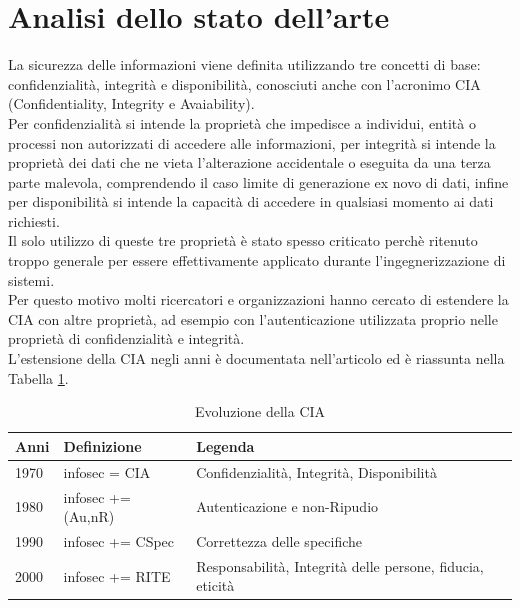 \section{Analisi dello stato dell'arte}

La sicurezza delle informazioni viene definita utilizzando tre concetti di base:
confidenzialità, integrità e disponibilità, conosciuti anche con l'acronimo CIA (Confidentiality, Integrity e Avaiability).\\
Per confidenzialità si intende la proprietà che impedisce a individui, entità o processi non autorizzati di accedere alle informazioni, per integrità si intende la proprietà dei dati che ne vieta l'alterazione accidentale o eseguita da una terza parte malevola, comprendendo il caso limite di generazione ex novo di dati, infine per disponibilità si intende la capacità di accedere in qualsiasi momento ai dati richiesti.\\
Il solo utilizzo di queste tre proprietà è stato spesso criticato perchè ritenuto troppo generale per essere effettivamente applicato durante l'ingegnerizzazione di sistemi.\\
Per questo motivo molti ricercatori e organizzazioni hanno cercato di estendere la CIA con altre proprietà, ad esempio con l'autenticazione utilizzata proprio nelle proprietà di confidenzialità e integrità.\\
L'estensione della CIA negli anni è documentata nell'articolo \cite*{SC14} ed è riassunta nella Tabella \ref*{tab:cia}.

\begin{table}[h!]
    \begin{tabular}{@{}lll@{}}
    \toprule
    \textbf{Anni} & \textbf{Definizione} & \textbf{Legenda}                                          \\ \midrule
    1970         & infosec = CIA        & Confidenzialità, Integrità, Disponibilità                 \\
    1980         & infosec += (Au,nR)   & Autenticazione e non-Ripudio                              \\
    1990         & infosec += CSpec     & Correttezza delle specifiche                              \\
    2000         & infosec += RITE      & Responsabilità, Integrità delle persone, fiducia, eticità \\ \bottomrule
    \end{tabular}
    \caption{Evoluzione della CIA}
    \label{tab:cia}
    \end{table}

